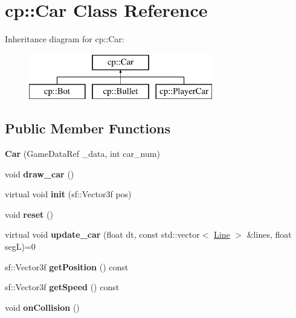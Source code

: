\hypertarget{classcp_1_1_car}{}\section{cp\+:\+:Car Class Reference}
\label{classcp_1_1_car}
Inheritance diagram for cp\+:\+:Car\+:\begin{figure}[H]
\begin{center}
\leavevmode
\includegraphics[height=2.000000cm]{classcp_1_1_car}
\end{center}
\end{figure}
\subsection*{Public Member Functions}
\begin{DoxyCompactItemize}
\item 
\mbox{\label{classcp_1_1_car_a46616a5f3b166d287038bd112a2febf6}} 
{\bfseries Car} (Game\+Data\+Ref \+\_\+data, int car\+\_\+num)
\item 
\mbox{\label{classcp_1_1_car_ad1ba1efee8393261c0df5665135a58f2}} 
void {\bfseries draw\+\_\+car} ()
\item 
\mbox{\label{classcp_1_1_car_a5314aafa100c37ff64a5f42e80421347}} 
virtual void {\bfseries init} (sf\+::\+Vector3f pos)
\item 
\mbox{\label{classcp_1_1_car_aa9b3ace5ba3809f03b2d7ee2f692cb47}} 
void {\bfseries reset} ()
\item 
\mbox{\label{classcp_1_1_car_a61f07d533f15f6241df726252ba634a5}} 
virtual void {\bfseries update\+\_\+car} (float dt, const std\+::vector$<$ \hyperlink{classcp_1_1_line}{Line} $>$ \&lines, float segL)=0
\item 
\mbox{\label{classcp_1_1_car_a1064f8e1d5f6ce98010ad7bdcd6f2648}} 
sf\+::\+Vector3f {\bfseries get\+Position} () const
\item 
\mbox{\label{classcp_1_1_car_a57ea04dccfe2c989ff4de7071709c2fd}} 
sf\+::\+Vector3f {\bfseries get\+Speed} () const
\item 
\mbox{\label{classcp_1_1_car_a962c79b26ad0cee458e6fa1514161179}} 
void {\bfseries on\+Collision} ()
\end{DoxyCompactItemize}
